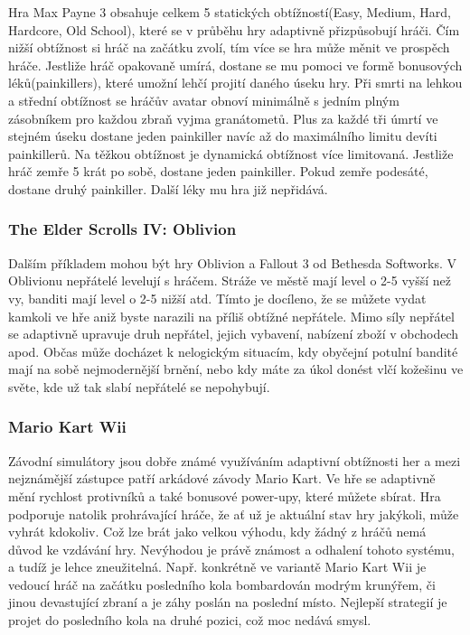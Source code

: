 Hra Max Payne 3 obsahuje celkem 5 statických obtížností(Easy, Medium, Hard, Hardcore, Old School), které se v průběhu hry adaptivně přizpůsobují hráči. Čím nižší obtížnost si hráč na začátku zvolí, tím více se hra může měnit ve prospěch hráče.
Jestliže hráč opakovaně umírá, dostane se mu pomoci ve formě bonusových léků(painkillers), které umožní lehčí projití daného úseku hry. Při smrti na lehkou a střední obtížnost se hráčův avatar obnoví minimálně s jedním plným zásobníkem pro každou zbraň vyjma granátometů. Plus za každé tři úmrtí ve stejném úseku dostane jeden painkiller navíc až do maximálního limitu devíti painkillerů.
Na těžkou obtížnost je dynamická obtížnost více limitovaná. Jestliže hráč zemře 5 krát po sobě, dostane jeden painkiller. Pokud zemře podesáté, dostane druhý painkiller. Další léky mu hra již nepřidává. \cite{3}

\subsubsection{The Elder Scrolls IV: Oblivion}

Dalším příkladem mohou být hry Oblivion a Fallout 3 od Bethesda Softworks. V Oblivionu nepřátelé levelují s hráčem. Stráže ve městě mají level o 2-5 vyšší než vy, banditi mají level o 2-5 nižší atd. Tímto je docíleno, že se můžete vydat kamkoli ve hře aniž byste narazili na příliš obtížné nepřátele. Mimo síly nepřátel se adaptivně upravuje druh nepřátel, jejich vybavení, nabízení zboží v obchodech apod. Občas může docházet k nelogickým situacím, kdy obyčejní potulní bandité mají na sobě nejmodernější brnění, nebo kdy máte za úkol donést vlčí kožešinu ve světe, kde už tak slabí nepřátelé se nepohybují. \cite{4}

\subsubsection{Mario Kart Wii}

Závodní simulátory jsou dobře známé využíváním adaptivní obtížnosti her a mezi nejznámější zástupce patří arkádové závody Mario Kart. Ve hře se adaptivně mění rychlost protivníků a také bonusové power-upy, které můžete sbírat. Hra podporuje natolik prohrávající hráče, že ať už je aktuální stav hry jakýkoli, může vyhrát kdokoliv.
Což lze brát jako velkou výhodu, kdy žádný z hráčů nemá důvod ke vzdávání hry. Nevýhodou je právě známost a odhalení tohoto systému, a tudíž je lehce zneužitelná. Např. konkrétně ve variantě Mario Kart Wii je vedoucí hráč na začátku posledního kola bombardován modrým krunýřem, či jinou devastující zbraní a je záhy poslán na poslední místo. Nejlepší strategií je projet do posledního kola na druhé pozici, což moc nedává smysl. \cite{5}

